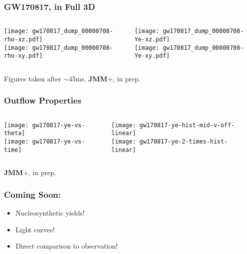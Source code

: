 \documentclass[]{beamer}
\begin{document}
\begin{frame}
  \frametitle{GW170817, in Full 3D}
  \begin{columns}
    \begin{column}{6cm}
      \begin{center}
        \texttt{[image: gw170817\_dump\_00000708-rho-xz.pdf]}\\
        \texttt{[image: gw170817\_dump\_00000708-rho-xy.pdf]}
      \end{center}      
    \end{column}
    \begin{column}{6cm}
      \begin{center}
        \texttt{[image: gw170817\_dump\_00000708-Ye-xz.pdf]}\\
        \texttt{[image: gw170817\_dump\_00000708-Ye-xy.pdf]}
      \end{center}
    \end{column}
  \end{columns}
  Figures taken after $\sim$45ms. \textbf{JMM}+, in prep.
\end{frame}

\begin{frame}
  \frametitle{Outflow Properties}
  \begin{columns}
    \begin{column}{6.5cm}
      \begin{center}
        \texttt{[image: gw170817-ye-vs-theta]}\\
        \texttt{[image: gw170817-ye-vs-time]}
      \end{center}
    \end{column}
    \begin{column}{5.5cm}
      \begin{center}
        \texttt{[image: gw170817-ye-hist-mid-v-off-linear]}\\
        \texttt{[image: gw170817-ye-2-times-hist-linear]}
      \end{center}
    \end{column}
  \end{columns}
  \textbf{JMM}+, in prep.
\end{frame}

\begin{frame}
  \frametitle{Coming Soon:}
  \begin{itemize}
  \item Nucleosynthetic yields!
  \item Light curves!
  \item Direct comparison to observation!
  \end{itemize}
\end{frame}
\end{document}
